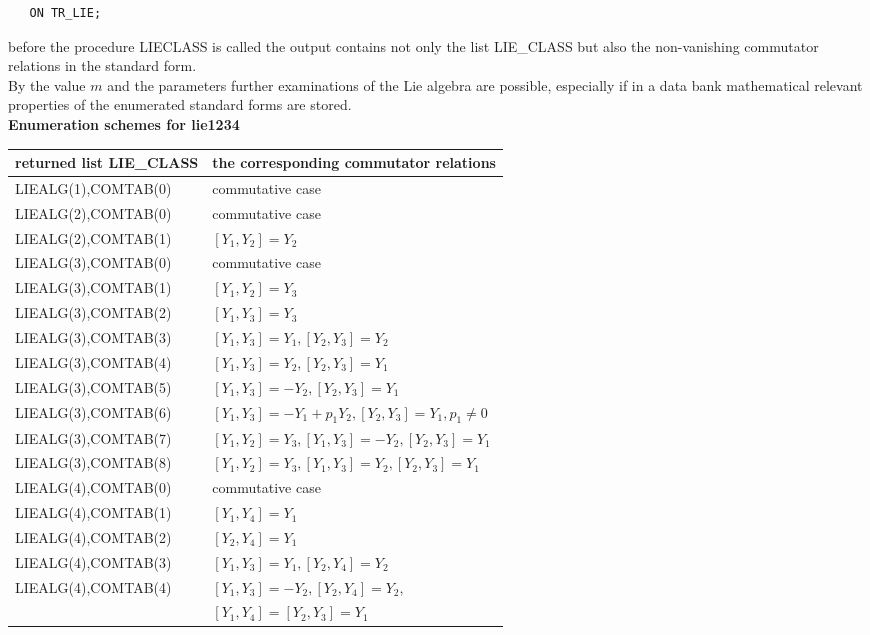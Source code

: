 \begin{verbatim}
   ON TR_LIE;
\end{verbatim}
before the procedure LIECLASS is called the output contains not only the
list LIE\_CLASS but also the non-vanishing commutator relations in the
standard form.\\[0.1cm]
By the value $m$ and the parameters further examinations of the Lie algebra
are possible, especially if in a data bank mathematical relevant properties
of the enumerated standard forms are stored.\\[0.3cm]
{\large\bf Enumeration schemes for lie1234}\\[0.2cm]
\hspace*{0.3cm}\begin{tabular}{l|l}returned list LIE\_CLASS&
the corresponding commutator relations\\[0.1cm]\hline
{LIEALG(1),COMTAB(0)}&commutative case\\[0.1cm]\hline
{LIEALG(2),COMTAB(0)}&commutative case\\[0.1cm]
{LIEALG(2),COMTAB(1)}&$[Y_1,Y_2]=Y_2$\\[0.1cm]\hline
{LIEALG(3),COMTAB(0)}&commutative case\\[0.1cm]
{LIEALG(3),COMTAB(1)}&$[Y_1,Y_2]=Y_3$\\[0.1cm]
{LIEALG(3),COMTAB(2)}&$[Y_1,Y_3]=Y_3$\\[0.1cm]
{LIEALG(3),COMTAB(3)}&$[Y_1,Y_3]=Y_1,[Y_2,Y_3]=Y_2$\\[0.1cm]
{LIEALG(3),COMTAB(4)}&$[Y_1,Y_3]=Y_2,[Y_2,Y_3]=Y_1$\\[0.1cm]
{LIEALG(3),COMTAB(5)}&$[Y_1,Y_3]=-Y_2,[Y_2,Y_3]=Y_1$\\[0.1cm]
{LIEALG(3),COMTAB(6)}&$[Y_1,Y_3]=-Y_1+p_1 Y_2,[Y_2,Y_3]=Y_1,p_1\neq 0$\\[0.1cm]
{LIEALG(3),COMTAB(7)}&$[Y_1,Y_2]=Y_3,[Y_1,Y_3]=-Y_2,[Y_2,Y_3]=Y_1$\\[0.1cm]
{LIEALG(3),COMTAB(8)}&$[Y_1,Y_2]=Y_3,[Y_1,Y_3]=Y_2,[Y_2,Y_3]=Y_1$\\[0.1cm]\hline
{LIEALG(4),COMTAB(0)}&commutative case\\[0.1cm]
{LIEALG(4),COMTAB(1)}&$[Y_1,Y_4]=Y_1$\\[0.1cm]
{LIEALG(4),COMTAB(2)}&$[Y_2,Y_4]=Y_1$\\[0,1cm]
{LIEALG(4),COMTAB(3)}&$[Y_1,Y_3]=Y_1,[Y_2,Y_4]=Y_2$\\[0.1cm]
{LIEALG(4),COMTAB(4)}&$[Y_1,Y_3]=-Y_2,[Y_2,Y_4]=Y_2,$\\
                     &$[Y_1,Y_4]=[Y_2,Y_3]=Y_1$\\[0.1cm]

\end{tabular}
